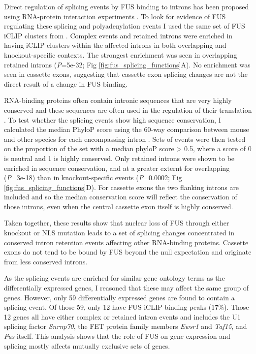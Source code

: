 Direct regulation of splicing events by FUS binding to introns has been proposed using RNA-protein interaction experiments \citep{Lagier-Tourenne2012,Rogelj2012, Ishigaki2012}.
To look for evidence of FUS regulating these splicing and polyadenylation events I used the same set of FUS iCLIP clusters from \citep{Rogelj2012}.
Complex events and retained introns were enriched in having iCLIP clusters within the affected introns in both overlapping and knockout-specific contexts.
The strongest enrichment was seen in overlapping retained introns (\textit{P}=5e-32; Fig \ref{fig:fus_splicing_functions}A). 
No enrichment was seen in cassette exons, suggesting that cassette exon splicing changes are not the direct result of a change in FUS binding.

RNA-binding proteins often contain intronic sequences that are very highly conserved \citep{Lareau2007} and these sequences are often used in the regulation of their translation \citep{Ni2007}.
To test whether the splicing events show high sequence conservation, I calculated the median PhyloP score using the 60-way comparison between mouse and other species for each encompassing intron \citep{Pollard2010-fj}.
Sets of events were then tested on the proportion of the set with a median phyloP score > 0.5, where a score of 0 is neutral and 1 is highly conserved.
Only retained introns were shown to be enriched in sequence conservation, and  at a greater externt for overlapping (\textit{P}=3e-18) than in knockout-specific events (\textit{P}=0.0002; Fig \ref{fig:fus_splicing_functions}D). 
For cassette exons the two flanking introns are included and so the median conservation score will reflect the conservation of those introns, even when the central cassette exon itself is highly conserved.

Taken together, these results show that nuclear loss of FUS through either knockout or NLS mutation leads to a set of splicing changes concentrated in conserved intron retention events affecting other RNA-binding proteins.
 Cassette exons do not tend to be bound by FUS beyond the null expectation and originate from less conserved introns.

As the splicing events are enriched for similar gene ontology terms as the differentially expressed genes, I reasoned that these may affect the same group of genes.
However, only 59 differentially expressed genes are found to contain a splicing event. 
Of those 59, only 12 have FUS iCLIP binding peaks (17\%).
Those 12 genes all have either complex or retained intron events and includes the U1 splicing factor \textit{Snrnp70}, the FET protein family members \textit{Ewsr1} and \textit{Taf15}, and \textit{Fus} itself. 
This analysis shows that the role of FUS on gene expression and splicing mostly affects mutually exclusive sets of genes.


